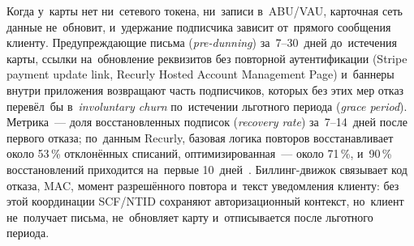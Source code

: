 Когда у~карты нет ни~сетевого токена, ни~записи в~ABU/VAU, карточная сеть
данные не~обновит, и~удержание подписчика зависит от~прямого сообщения клиенту.
Предупреждающие письма (\textit{pre-dunning}) за~7--30~дней до~истечения карты,
ссылки на~обновление реквизитов без повторной аутентификации (Stripe payment
update link, Recurly Hosted Account Management Page) и~баннеры внутри приложения
возвращают часть подписчиков, которых без этих мер отказ перевёл~бы
в~\textit{involuntary churn} по~истечении льготного периода
(\textit{grace period}). Метрика~--- доля восстановленных подписок
(\textit{recovery rate}) за~7--14~дней после первого отказа; по~данным Recurly,
базовая логика повторов восстанавливает около 53\,\% отклонённых списаний,
оптимизированная~--- около 71\,\%, и~90\,\% восстановлений приходится на~первые
10~дней~\cite{recurly-failed-payment-recovery-2026}. Биллинг-движок
связывает код отказа, MAC,
момент разрешённого повтора и~текст уведомления клиенту: без этой координации
SCF/NTID сохраняют авторизационный контекст, но~клиент не~получает письма,
не~обновляет карту и~отписывается после льготного периода.

